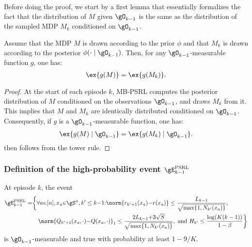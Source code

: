 \begin{subappendices}
Before doing the proof, we start by a first lemma that essentially formalizes the fact that the distribution of $M$ given $\gO_{k-1}$ is the same as the distribution of the sampled MDP $M_{k}$ conditioned on $\gO_{k-1}$. 
\begin{lem}
    \label{lem:bayesian}
    Assume that the MDP $M$ is drawn according to the prior $\phi$ and that $M_k$ is drawn according to the posterior $\phi(\cdot \mid \gO_{k-1})$. Then, for any $\gO_{k-1}$-measurable function $g$, one has:
    \begin{align}
        \label{eq:lem_bayesian}
        \ex{g(M)} = \ex{g(M_k)}. 
    \end{align}
\end{lem}
\begin{proof}
    At the start of each episode $k$, MB-PSRL computes the posterior distribution of $M$ conditioned on the observations $\gO_{k-1}$, and draws $M_k$ from it. This implies that $M$ and $M_k$ are identically distributed conditioned on $\gO_{k-1}$. Consequently, if $g$ is a $\gO_{k-1}$-measurable function, one has:
    \begin{align*}
        \ex{g(M) \mid \gO_{k-1}} = \ex{g(M_k) \mid \gO_{k-1}}. 
    \end{align*}
     then follows from the tower rule. 
\end{proof}

\subsubsection{Definition of the high-probability event $\gE^\text{PSRL}_{k-1}$}

\begin{lem}
    \label{lem:concentration_psrl}
    At episode $k$, the event
    \begin{align*}
        \gE^\text{PSRL}_{k-1} = &\bigg\{ \forall a{\in}[n], x_a{\in}\gS^a, k'\le k{-}1{:}
            \norm{r_{k'+1}(x_a){-}r(x_a)} \le\frac{L_{k-1}}{\sqrt{\max\{1,N_{k'}(x_a)\} }}, \\
            &\quad\norm{Q_{k'+1}(x_a,\cdot) {-}Q(x_a,\cdot)}_1 \le\frac{2L_{k-1}{+}3\sqrt{S}}{\sqrt{\max\{1,N_{k'}(x_a)\} }}, \text{ and } H_{k'}\le \frac{\log(K(k-1))}{1-\beta} \bigg\}
    \end{align*}
    is $\gO_{k-1}$-measurable and true with probability at least $1-9/K$.
\end{lem}


\end{subappendices}
